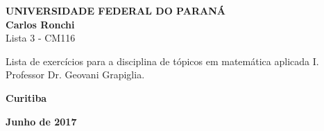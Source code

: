 \documentclass[a4paper,10pt]{article}
\begin{document}
  \begin{titlepage}
   \vfill
      \begin{center}
          {\large \textbf{UNIVERSIDADE FEDERAL DO PARANÁ}} \\[2.5cm]

          {\large \textbf{Carlos Ronchi}}\\[4cm]


          {\Large Lista 3 - CM116}\\[4cm]

          \hspace{.45\textwidth} %
          \begin{minipage}{.5\textwidth}
              \large Lista de exercícios para a disciplina de tópicos em matemática aplicada I.\\[1cm]
              Professor Dr. Geovani Grapiglia.
          \end{minipage}
          \vfill

          \vspace{2cm}

          \large \textbf{Curitiba}

          \large \textbf{Junho de 2017}
      \end{center}
  \end{titlepage}
\end{document}

